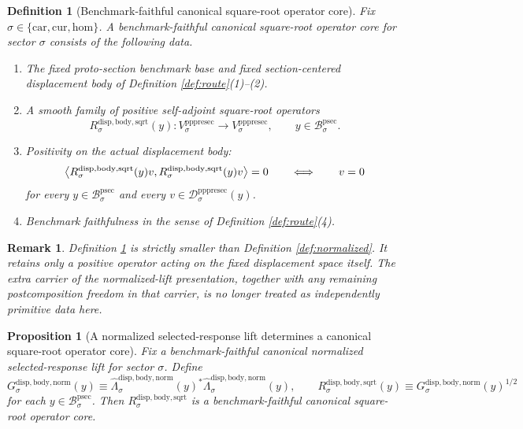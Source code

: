 \documentclass[11pt]{article}
\newcommand{\Car}{\mathrm{car}}
\newcommand{\Cur}{\mathrm{cur}}
\newcommand{\Hom}{\mathrm{hom}}
\newcommand{\ProtoSectionBody}[1]{\mathcal B_{#1}^{\mathrm{psec}}}
\newcommand{\PrePreProtoSectionVertical}[1]{V_{#1}^{\mathrm{pppresec}}}
\newcommand{\PrePreProtoSectionResidualBody}[1]{\mathcal D_{#1}^{\mathrm{pppresec}}}
\newcommand{\NormalizedSelectedResponseLift}[1]{\widehat{\Lambda}_{#1}^{\mathrm{disp,body,norm}}}
\newcommand{\SquareRootOperator}[1]{R_{#1}^{\mathrm{disp,body,sqrt}}}
\newcommand{\GramOperator}[1]{G_{#1}^{\mathrm{disp,body,norm}}}
\newtheorem{definition}{Definition}
\newtheorem{proposition}{Proposition}
\newtheorem{remark}{Remark}
\begin{document}
\begin{definition}[Benchmark-faithful canonical square-root operator core]
\label{def:sqrtcore}
Fix \(\sigma\in\{\Car,\Cur,\Hom\}\). A \emph{benchmark-faithful canonical square-root operator core} for sector \(\sigma\) consists of the following data.
\begin{enumerate}
    \item The fixed proto-section benchmark base and fixed section-centered displacement body of Definition \ref{def:route}(1)--(2).
    \item A smooth family of positive self-adjoint square-root operators
    \[
    \SquareRootOperator{\sigma}(y):
    \PrePreProtoSectionVertical{\sigma}\to\PrePreProtoSectionVertical{\sigma},
    \qquad
    y\in\ProtoSectionBody{\sigma}.
    \]
    \item Positivity on the actual displacement body:
    \[
    \ev{
    \SquareRootOperator{\sigma}(y)v,
    \SquareRootOperator{\sigma}(y)v
    }
    =0
    \qquad\Longleftrightarrow\qquad
    v=0
    \]
    for every \(y\in\ProtoSectionBody{\sigma}\) and every \(v\in\PrePreProtoSectionResidualBody{\sigma}(y)\).
    \item Benchmark faithfulness in the sense of Definition \ref{def:route}(4).
\end{enumerate}
\end{definition}

\begin{remark}
Definition \ref{def:sqrtcore} is strictly smaller than Definition \ref{def:normalized}. It retains only a positive operator acting on the fixed displacement space itself. The extra carrier of the normalized-lift presentation, together with any remaining postcomposition freedom in that carrier, is no longer treated as independently primitive data here.
\end{remark}

\begin{proposition}[A normalized selected-response lift determines a canonical square-root operator core]
\label{prop:sqrt}
Fix a benchmark-faithful canonical normalized selected-response lift for sector \(\sigma\). Define
\begin{equation}
\GramOperator{\sigma}(y)
\equiv
\NormalizedSelectedResponseLift{\sigma}(y)^*
\NormalizedSelectedResponseLift{\sigma}(y),
\qquad
\SquareRootOperator{\sigma}(y)
\equiv
\GramOperator{\sigma}(y)^{1/2}
\label{eq:sqrtcore}
\end{equation}
for each \(y\in\ProtoSectionBody{\sigma}\). Then \(\SquareRootOperator{\sigma}\) is a benchmark-faithful canonical square-root operator core.
\end{proposition}
\end{document}
